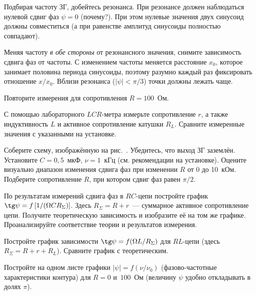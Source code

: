 \begin{lab:task}
\item Подбирая частоту ЗГ, добейтесь резонанса. 
При резонансе должен наблюдаться нулевой сдвиг фаз $\psi=0$ (почему?).
При этом нулевые значения двух 
синусоид должны совместиться (а при равенстве амплитуд синусоиды 
полностью совпадают).
 
\item Меняя частоту \emph{в обе стороны} от резонансного значения, 
снимите зависимость сдвига фаз от частоты. С изменением частоты меняется 
расстояние $x_0$, которое занимает половина периода синусоиды, поэтому 
разумно каждый раз фиксировать отношение $x/x_0$. 
Вблизи резонанса ($|\psi|<\pi/3$) точки должны лежать чаще.
 
\item Повторите измерения для сопротивления $R=100$~Ом.
 
\item С помощью лабораторного $LCR$-метра измерьте сопротивление $r$,
а также индуктивность $L$ и активное сопротивление катушки $R_L$. 
Сравните измеренные значения с указанными на установке.



\item Соберите схему, изображённую на рис.~. Убедитесь, что 
выход ЗГ заземлён. Установите $C=0,5$~мкФ,  $\nu=1$~кГц
(см. рекомендации на установке). Оцените визуально диапазон изменения 
сдвига фаз при изменении $R$ от 0 до 10~кОм.
Подберите сопротивление $R$, при котором сдвиг фаз равен $\pi/2$.



\item По результатам измерений сдвига фаз в $RC$-цепи постройте график
$\tg\psi=f\left[1/(\Omega C R_{\Sigma})\right]$. Здесь $R_{\Sigma}=R+r$~--- 
суммарное активное сопротивление цепи. Получите теоретическую 
зависимость и изобразите её на том же графике. Проанализируйте
соответствие теории и результатов измерения.

\item Постройте график зависимости $\tg\psi=f(\Omega L/R_{\Sigma})$ 
для $RL$-цепи (здесь $R_{\Sigma}=R+r+R_L$). Сравните график с теоретическим.

\item Постройте на одном листе графики $|\psi|=f(\nu/\nu_0)$ 
(фазово-частотные характеристики контура) для $R=0$ и~$100$~Ом (величину $\psi$ удобно откладывать в долях $\pi$).


\end{lab:task}
